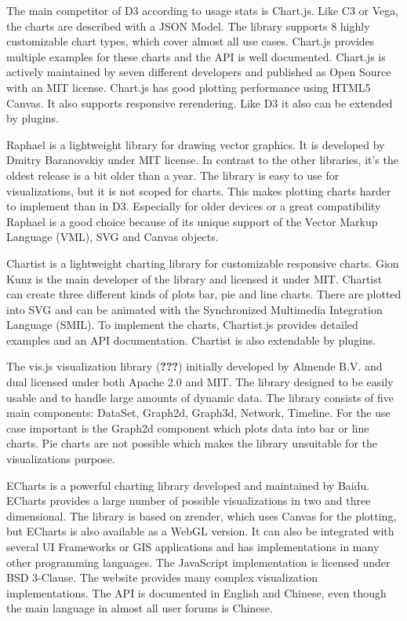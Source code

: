 \documentclass[american,a4paper,oneside,,tablecaptionabove]{scrbook}
\begin{document}
The main competitor of D3 according to usage stats is Chart.js. Like C3
or Vega, the charts are described with a JSON Model. The library
supports 8 highly customizable chart types, which cover almost all use
cases. Chart.js provides multiple examples for these charts and the API
is well documented. Chart.js is actively maintained by seven different
developers and published as Open Source with an MIT license. Chart.js
has good plotting performance using HTML5 Canvas. It also supports
responsive rerendering. Like D3 it also can be extended by plugins.

Raphael is a lightweight library for drawing vector graphics. It is
developed by Dmitry Baranovskiy under MIT license. In contrast to the
other libraries, it's the oldest release is a bit older than a year. The
library is easy to use for visualizations, but it is not scoped for
charts. This makes plotting charts harder to implement than in D3.
Especially for older devices or a great compatibility Raphael is a good
choice because of its unique support of the Vector Markup Language
(VML), SVG and Canvas objects.

Chartist is a lightweight charting library for customizable responsive
charts. Gion Kunz is the main developer of the library and licensed it
under MIT. Chartist can create three different kinds of plots bar, pie
and line charts. There are plotted into SVG and can be animated with the
Synchronized Multimedia Integration Language (SMIL). To implement the
charts, Chartist.js provides detailed examples and an API documentation.
Chartist is also extendable by plugins.

The vis.js visualization library ({\textbf{???}}) initially developed by
Almende B.V. and dual licensed under both Apache 2.0 and MIT. The
library designed to be easily usable and to handle large amounts of
dynamic data. The library consists of five main components: DataSet,
Graph2d, Graph3d, Network, Timeline. For the use case important is the
Graph2d component which plots data into bar or line charts. Pie charts
are not possible which makes the library unsuitable for the
visualizations purpose.

ECharts is a powerful charting library developed and maintained by
Baidu. ECharts provides a large number of possible visualizations in two
and three dimensional. The library is based on zrender, which uses
Canvas for the plotting, but ECharts is also available as a WebGL
version. It can also be integrated with several UI Frameworks or GIS
applications and has implementations in many other programming
languages. The JavaScript implementation is licensed under BSD 3-Clause.
The website provides many complex visualization implementations. The API
is documented in English and Chinese, even though the main language in
almost all user forums is Chinese.
\end{document}
